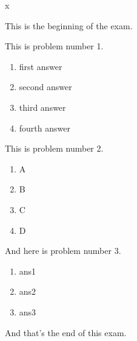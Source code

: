 x\documentclass{article}
\begin{document}
This is the beginning of the exam.

\begin{problem}
  This is problem number 1.

  \begin{enumerate}
  \item first answer
  \item second answer
  \item third answer
  \item fourth answer
  \end{enumerate}
\end{problem}

\begin{problem}
  This is problem number 2.
  \begin{enumerate}
  \item A
  \item B
  \item C
  \item D
  \end{enumerate}
\end{problem}

\begin{problem}
  And here is problem number 3.
  \begin{enumerate}
  \item ans1
  \item ans2
  \item ans3
  \end{enumerate}
\end{problem}

And that's the end of this exam.
\end{document}
